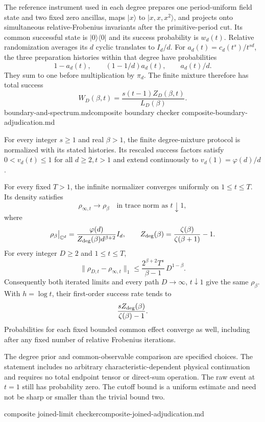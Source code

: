 The reference instrument used in each degree prepares one period-uniform
field state and two fixed zero ancillas, maps $|x\rangle$ to
$|x,x,x^2\rangle$, and projects onto simultaneous relative-Frobenius
invariants after the primitive-period cut. Its common successful state is
$|0\rangle\langle0|$ and its success probability is $w_d(t)$. Relative
randomization averages its $d$ cyclic translates to $I_d/d$.
For $a_d(t)=c_d(t^s)/t^{sd}$, the three preparation histories within
that degree have probabilities
\[
 1-a_d(t),\qquad (1-1/d)a_d(t),\qquad a_d(t)/d.
\]
They sum to one before multiplication by $\pi_d$. The finite mixture
therefore has total success
\[
 W_D(\beta,t)=\frac{s(t-1)Z_D(\beta,t)}{L_D(\beta)}.
\]
{boundary-and-spectrum.md}{composite boundary checker}
{composite-boundary-adjudication.md}

\begin{theorem}
\statusProved\quad
For every integer $s\geq1$ and real $\beta>1$, the finite degree-mixture
protocol is normalized with its stated histories. Its rescaled success
factors satisfy $0<v_d(t)\leq1$ for all $d\geq2,t>1$ and extend
continuously to $v_d(1)=\varphi(d)/d$.

For every fixed $T>1$, the infinite normalizer converges uniformly on
$1\leq t\leq T$. Its density satisfies
\[
 \rho_{\infty,t}\longrightarrow\rho_\beta
       \quad\text{in trace norm as }t\downarrow1,
\]
where
\[
 \rho_\beta\big|_{\mathbb C^d}
 =\frac{\varphi(d)}{Z_{\rm deg}(\beta)d^{\beta+2}}I_d,\qquad
 Z_{\rm deg}(\beta)=\frac{\zeta(\beta)}{\zeta(\beta+1)}-1.
\]
For every integer $D\geq2$ and $1\leq t\leq T$,
\[
 \|\rho_{D,t}-\rho_{\infty,t}\|_1
 \leq \frac{2^{\beta+2}T^s}{\beta-1}\,D^{1-\beta}.
\]
Consequently both iterated limits and every path $D\to\infty$, $t\downarrow1$
give the same $\rho_\beta$. With $h=\log t$, their first-order success rate
tends to
\[
 \frac{sZ_{\rm deg}(\beta)}{\zeta(\beta)-1}.
\]
Probabilities for each fixed bounded common effect converge as well,
including after any fixed number of relative Frobenius iterations.
\end{theorem}
\begin{scope}
The degree prior and common-observable comparison are specified choices.
The statement includes no arbitrary characteristic-dependent physical
continuation and requires no total endpoint tensor or direct-sum operation.
The raw event at $t=1$ still has probability zero. The cutoff bound is a
uniform estimate and need not be sharp or smaller than the trivial bound two.
\end{scope}
{composite joined-limit checker}{composite-joined-adjudication.md}

